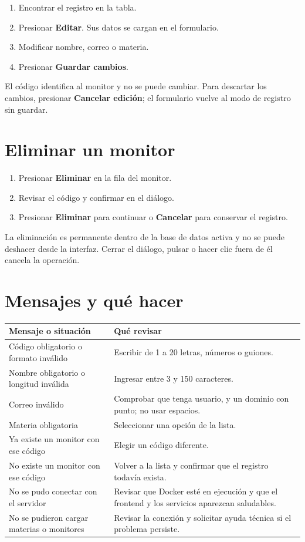 \begin{enumerate}
  \item Encontrar el registro en la tabla.
  \item Presionar \textbf{Editar}. Sus datos se cargan en el formulario.
  \item Modificar nombre, correo o materia.
  \item Presionar \textbf{Guardar cambios}.
\end{enumerate}

El código identifica al monitor y no se puede cambiar. Para descartar los cambios, presionar \textbf{Cancelar edición}; el formulario vuelve al modo de registro sin guardar.

\section{Eliminar un monitor}

\begin{enumerate}
  \item Presionar \textbf{Eliminar} en la fila del monitor.
  \item Revisar el código y confirmar en el diálogo.
  \item Presionar \textbf{Eliminar} para continuar o \textbf{Cancelar} para conservar el registro.
\end{enumerate}

La eliminación es permanente dentro de la base de datos activa y no se puede deshacer desde la interfaz. Cerrar el diálogo, pulsar  o hacer clic fuera de él cancela la operación.

\section{Mensajes y qué hacer}

\begin{tabularx}{\textwidth}{p{}Y}
\toprule
\textbf{Mensaje o situación} & \textbf{Qué revisar} \\
\midrule
Código obligatorio o formato inválido & Escribir de 1 a 20 letras, números o guiones. \\
Nombre obligatorio o longitud inválida & Ingresar entre 3 y 150 caracteres. \\
Correo inválido & Comprobar que tenga usuario,  y un dominio con punto; no usar espacios. \\
Materia obligatoria & Seleccionar una opción de la lista. \\
Ya existe un monitor con ese código & Elegir un código diferente. \\
No existe un monitor con ese código & Volver a la lista y confirmar que el registro todavía exista. \\
No se pudo conectar con el servidor & Revisar que Docker esté en ejecución y que el frontend y los servicios aparezcan saludables. \\
No se pudieron cargar materias o monitores & Revisar la conexión y solicitar ayuda técnica si el problema persiste. \\
\bottomrule
\end{tabularx}

